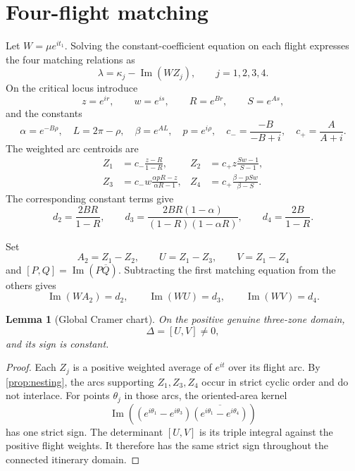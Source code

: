 \documentclass[11pt]{article}
\newtheorem{lemma}[theorem]{Lemma}
\newcommand{\im}{\operatorname{Im}}
\begin{document}
\section{Four-flight matching}\label{sec:matching}

Let $W=\mu e^{it_1}$.  Solving the constant-coefficient equation on each flight expresses the four matching relations as
\begin{equation}\label{eq:flight-match}
 \lambda=\kappa_j-\im(WZ_j),
 \qquad j=1,2,3,4.
\end{equation}
On the critical locus introduce
\begin{equation}\label{eq:laurent-variables}
 z=e^{ir},\qquad w=e^{is},\qquad
 R=e^{Br},\qquad S=e^{As},
\end{equation}
and the constants
\begin{equation}\label{eq:constants}
 \alpha=e^{-B\rho},\quad L=2\pi-\rho,\quad
 \beta=e^{AL},\quad p=e^{i\rho},\quad
 c_- =\frac{-B}{-B+i},\quad c_+=\frac{A}{A+i}.
\end{equation}
The weighted arc centroids are
\begin{align}
 Z_1&=c_-\frac{z-R}{1-R},
 &Z_2&=c_+z\frac{Sw-1}{S-1},\label{eq:centroids-12}\\
 Z_3&=c_-w\frac{\alpha pR-z}{\alpha R-1},
 &Z_4&=c_+\frac{\beta-pSw}{\beta-S}.\label{eq:centroids-34}
\end{align}
The corresponding constant terms give
\begin{equation}\label{eq:d-values}
 d_2=\frac{2BR}{1-R},\qquad
 d_3=\frac{2BR(1-\alpha)}{(1-R)(1-\alpha R)},\qquad
 d_4=\frac{2B}{1-R}.
\end{equation}

Set
\begin{equation}\label{eq:AUV}
 A_2=Z_1-Z_2,\qquad U=Z_1-Z_3,\qquad V=Z_1-Z_4
\end{equation}
and $[P,Q]=\im(P\overline Q)$.  Subtracting the first matching equation from the others gives
\begin{equation}\label{eq:linear-W}
 \im(WA_2)=d_2,\qquad \im(WU)=d_3,\qquad \im(WV)=d_4.
\end{equation}

\begin{lemma}[Global Cramer chart]\label{lem:cramer}
On the positive genuine three-zone domain,
\[
 \Delta=[U,V]\ne0,
\]
and its sign is constant.
\end{lemma}

\begin{proof}
Each $Z_j$ is a positive weighted average of $e^{it}$ over its flight arc.  By \cref{prop:nesting}, the arcs supporting $Z_1,Z_3,Z_4$ occur in strict cyclic order and do not interlace.  For points $\theta_j$ in those arcs, the oriented-area kernel
\[
 \im\!\left((e^{i\theta_1}-e^{i\theta_3})
 \overline{(e^{i\theta_1}-e^{i\theta_4})}\right)
\]
has one strict sign.  The determinant $[U,V]$ is its triple integral against the positive flight weights.  It therefore has the same strict sign throughout the connected itinerary domain.
\end{proof}
\end{document}
